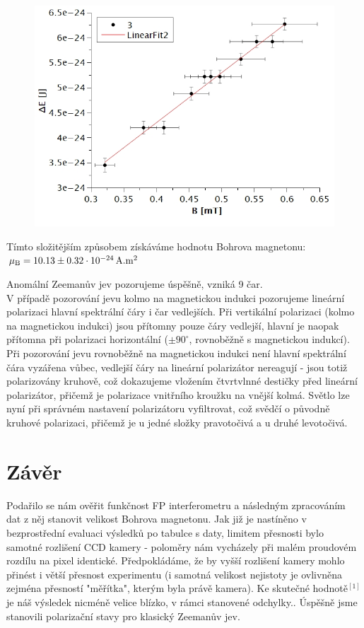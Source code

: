\documentclass[czech,11pt,a4paper]{article}
\begin{document}
\begin{multicols}{2}
		\begin{figure}[H]
			\centering
			\includegraphics[width=0.8\linewidth]{Graph3}
			\caption[Závislost E na B]{}
			\label{fig:graph3}
		\end{figure}
		
		Tímto složitějším způsobem získáváme hodnotu Bohrova magnetonu:\\ $\mu_\mathrm{B} = 10.13 \pm 0.32 \cdot 10^{-24}\,\rm A.m^2$
		
		 
		Anomální Zeemanův jev pozorujeme úspěšně, vzniká 9 čar.\\
		V případě pozorování jevu kolmo na magnetickou indukci pozorujeme lineární polarizaci hlavní spektrální čáry i čar vedlejších. Při vertikální polarizaci (kolmo na magnetickou indukci) jsou přítomny pouze čáry vedlejší, hlavní je naopak přítomna při polarizaci horizontální ($\pm 90^\circ$, rovnoběžně s magnetickou indukcí). Při pozorování jevu rovnoběžně na magnetickou indukci není hlavní spektrální čára vyzářena vůbec, vedlejší čáry na lineární polarizátor nereagují - jsou totiž polarizovány kruhově, což dokazujeme vložením čtvrtvlnné destičky před lineární polarizátor, přičemž je polarizace vnitřního kroužku na vnější kolmá. Světlo lze nyní při správném nastavení polarizátoru vyfiltrovat, což svědčí o původně kruhové polarizaci, přičemž je u jedné složky pravotočivá a u druhé levotočivá. 
		
		\section{Závěr}
		Podařilo se nám ověřit funkčnost FP interferometru a následným zpracováním dat z něj stanovit velikost Bohrova magnetonu. Jak již je nastíněno v bezprostřední evaluaci výsledků po tabulce s daty, limitem přesnosti bylo samotné rozlišení CCD kamery - poloměry nám vycházely při malém proudovém rozdílu na pixel identické. Předpokládáme, že by vyšší rozlišení kamery mohlo přinést i větší přesnost experimentu (i samotná velikost nejistoty je ovlivněna zejména přesností "měřítka", kterým byla právě kamera). Ke skutečné hodnotě$^{[1]}$ je náš výsledek nicméně velice blízko, v rámci stanovené odchylky.. Úspěšně jsme stanovili polarizační stavy pro klasický Zeemanův jev.
		

\end{multicols}
\end{document}
